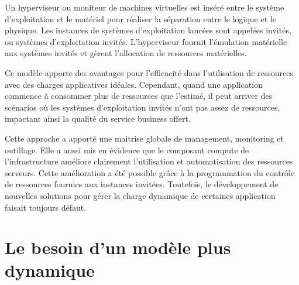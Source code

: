 Un hyperviseur ou moniteur de machines virtuelles est inséré entre le système d'exploitation et le matériel pour réaliser la séparation entre le logique et le physique. Les instances de systèmes d'exploitation lancées sont appelées invités, ou systèmes d'exploitation invités. L'hyperviseur fournit l'émulation matérielle aux systèmes invités et gèrent l'allocation de ressources matérielles.  

Ce modèle apporte des avantages pour l'efficacité dans l'utilisation de ressources avec des charges applicatives idéales.
 Cependant, quand une application commence à consommer plus de ressources que l'estimé, il peut arriver des scénarios où les systèmes d'exploitation invités n'ont pas assez de ressources, impactant ainsi la qualité du service business offert. 

Cette approche a apporté une maitrise globale de management, monitoring et outillage. Elle a aussi mis en évidence que le composant \og compute \fg{} de l'infrastructure améliore clairement l'utilisation et automatisation des ressources serveurs. Cette amélioration a été possible grâce à la programmation du contrôle de ressources fournies aux instances invitées. Toutefois, le développement de nouvelles solutions pour gérer la charge dynamique de certaines application faisait toujours défaut. \cite{ibmPlanningVirtCCchap2}\cite{journeySDDC}




\section{Le besoin d'un modèle plus dynamique}


